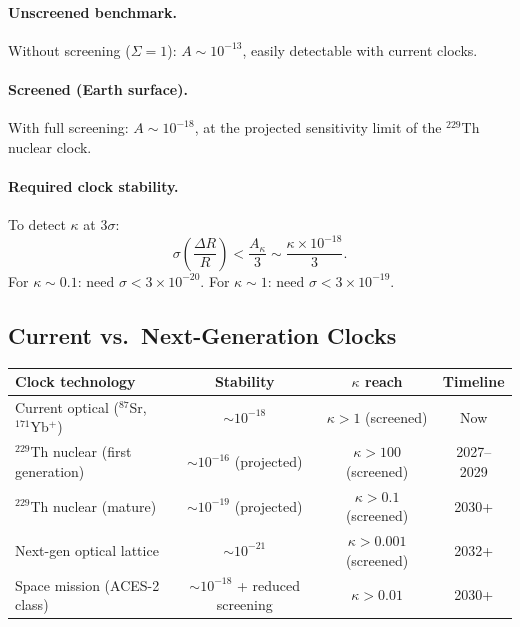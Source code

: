 \documentclass[11pt]{article}
\newcommand{\ee}[1]{\times 10^{#1}}
\begin{document}
\paragraph{Unscreened benchmark.}
Without screening ($\Sigma = 1$): $A \sim 10^{-13}$, easily
detectable with current clocks.

\paragraph{Screened (Earth surface).}
With full screening: $A \sim 10^{-18}$, at the projected
sensitivity limit of the $^{229}$Th nuclear clock.

\paragraph{Required clock stability.}
To detect $\kappa$ at $3\sigma$:
\begin{equation}
\sigma\left(\frac{\Delta R}{R}\right)
< \frac{A_{\kappa}}{3}
\sim \frac{\kappa \times 10^{-18}}{3}.
\end{equation}
For $\kappa \sim 0.1$: need $\sigma < 3\ee{-20}$.
For $\kappa \sim 1$: need $\sigma < 3\ee{-19}$.

\subsection{Current vs.\ Next-Generation Clocks}

\begin{center}
\begin{tabular}{lccc}
\toprule
\textbf{Clock technology} & \textbf{Stability} & \textbf{$\kappa$ reach}
& \textbf{Timeline} \\
\midrule
Current optical ($^{87}$Sr, $^{171}$Yb$^+$) &
  $\sim 10^{-18}$ & $\kappa > 1$ (screened) & Now \\
$^{229}$Th nuclear (first generation) &
  $\sim 10^{-16}$ (projected) & $\kappa > 100$ (screened) & 2027--2029 \\
$^{229}$Th nuclear (mature) &
  $\sim 10^{-19}$ (projected) & $\kappa > 0.1$ (screened) & 2030+ \\
Next-gen optical lattice &
  $\sim 10^{-21}$ & $\kappa > 0.001$ (screened) & 2032+ \\
Space mission (ACES-2 class) &
  $\sim 10^{-18}$ + reduced screening &
  $\kappa > 0.01$ & 2030+ \\
\bottomrule
\end{tabular}
\end{center}
\end{document}

